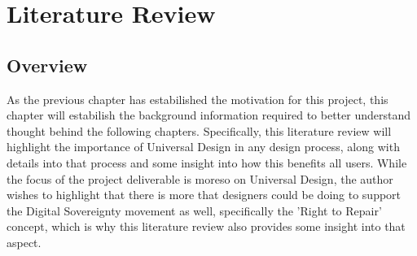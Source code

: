 
\chapter{Literature Review} %

\label{Chapter2} %


\section{Overview} %

As the previous chapter has estabilished the motivation for this project, this chapter will estabilish the background information required to better understand thought behind the following chapters.
Specifically, this literature review will highlight the importance of Universal Design in any design process, along with details into that process and some insight into how this benefits all users.
While the focus of the project deliverable is moreso on Universal Design, the author wishes to highlight that there is more that designers could be doing to support the Digital Sovereignty movement as well, specifically the 'Right to Repair' concept, which is why this literature review also provides some insight into that aspect.


